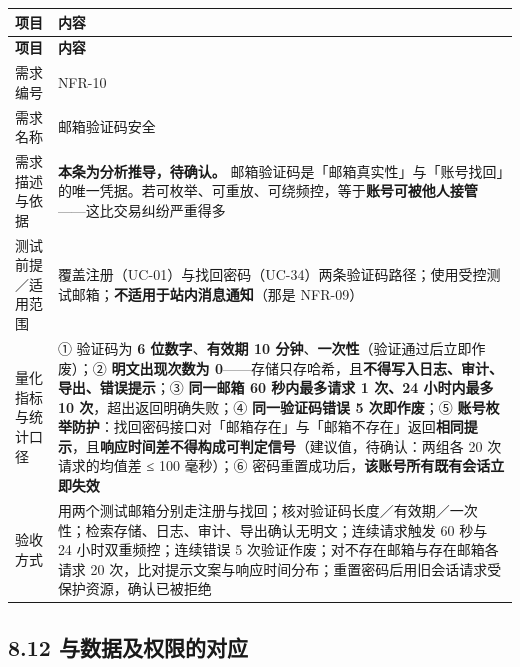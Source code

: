 \documentclass[12pt,a4paper]{ctexart}
\begin{document}
{\scriptsize
\begin{longtable}{|p{2.75cm}|p{13.25cm}|}
\hline
\textbf{项目} & \textbf{内容} \\
\hline
\endfirsthead
\hline
\textbf{项目} & \textbf{内容} \\
\hline
\endhead
\hline
\endfoot
需求编号 & NFR-10 \\
\hline
需求名称 & 邮箱验证码安全 \\
\hline
需求描述与依据 & \textbf{本条为分析推导，待确认。} 邮箱验证码是「邮箱真实性」与「账号找回」的唯一凭据。若可枚举、可重放、可绕频控，等于\textbf{账号可被他人接管}——这比交易纠纷严重得多 \\
\hline
测试前提／适用范围 & 覆盖注册（UC-01）与找回密码（UC-34）两条验证码路径；使用受控测试邮箱；\textbf{不适用于站内消息通知}（那是 NFR-09） \\
\hline
量化指标与统计口径 & ① 验证码为 \textbf{6 位数字}、\textbf{有效期 10 分钟}、\textbf{一次性}（验证通过后立即作废）；② \textbf{明文出现次数为 0}——存储只存哈希，且\textbf{不得写入日志、审计、导出、错误提示}；③ \textbf{同一邮箱 60 秒内最多请求 1 次、24 小时内最多 10 次}，超出返回明确失败；④ \textbf{同一验证码错误 5 次即作废}；⑤ \textbf{账号枚举防护}：找回密码接口对「邮箱存在」与「邮箱不存在」返回\textbf{相同提示}，且\textbf{响应时间差不得构成可判定信号}（建议值，待确认：两组各 20 次请求的均值差 ≤ 100 毫秒）；⑥ 密码重置成功后，\textbf{该账号所有既有会话立即失效} \\
\hline
验收方式 & 用两个测试邮箱分别走注册与找回；核对验证码长度／有效期／一次性；检索存储、日志、审计、导出确认无明文；连续请求触发 60 秒与 24 小时双重频控；连续错误 5 次验证作废；对不存在邮箱与存在邮箱各请求 20 次，比对提示文案与响应时间分布；重置密码后用旧会话请求受保护资源，确认已被拒绝 \\
\hline
\end{longtable}
}


\subsection*{8.12 与数据及权限的对应}
\end{document}
